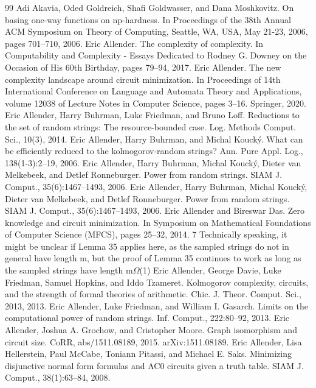 \begin{thebibliography}{99}
 Adi Akavia, Oded Goldreich, Shafi Goldwasser, and Dana Moshkovitz. On basing one-way functions on np-hardness. In Proceedings of the 38th Annual ACM Symposium on Theory of Computing, Seattle, WA, USA, May 21-23, 2006, pages 701–710, 2006.
 Eric Allender. The complexity of complexity. In Computability and Complexity - Essays Dedicated to Rodney G. Downey on the Occasion of His 60th Birthday, pages 79–94, 2017.
 Eric Allender. The new complexity landscape around circuit minimization. In Proceedings of 14th International Conference on Language and Automata Theory and Applications, volume 12038 of Lecture Notes in Computer Science, pages 3–16. Springer, 2020.
 Eric Allender, Harry Buhrman, Luke Friedman, and Bruno Loff. Reductions to the set of random strings: The resource-bounded case. Log. Methods Comput. Sci., 10(3), 2014.
 Eric Allender, Harry Buhrman, and Michal Koucký. What can be efficiently reduced to the kolmogorov-random strings? Ann. Pure Appl. Log., 138(1-3):2–19, 2006.
 Eric Allender, Harry Buhrman, Michal Koucký, Dieter van Melkebeek, and Detlef Ronneburger. Power from random strings. SIAM J. Comput., 35(6):1467–1493, 2006.
 Eric Allender, Harry Buhrman, Michal Koucký, Dieter van Melkebeek, and Detlef Ronneburger. Power from random strings. SIAM J. Comput., 35(6):1467–1493, 2006.
 Eric Allender and Bireswar Das. Zero knowledge and circuit minimization. In Symposium on Mathematical Foundations of Computer Science (MFCS), pages 25–32, 2014. 7 Technically speaking, it might be unclear if Lemma 35 applies here, as the sampled strings do not in general have length m, but the proof of Lemma 35 continues to work as long as the sampled strings have length m$\Omega$(1)
 Eric Allender, George Davie, Luke Friedman, Samuel Hopkins, and Iddo Tzameret. Kolmogorov complexity, circuits, and the strength of formal theories of arithmetic. Chic. J. Theor. Comput. Sci., 2013, 2013.
 Eric Allender, Luke Friedman, and William I. Gasarch. Limits on the computational power of random strings. Inf. Comput., 222:80–92, 2013.
 Eric Allender, Joshua A. Grochow, and Cristopher Moore. Graph isomorphism and circuit size. CoRR, abs/1511.08189, 2015. arXiv:1511.08189.
 Eric Allender, Lisa Hellerstein, Paul McCabe, Toniann Pitassi, and Michael E. Saks. Minimizing disjunctive normal form formulas and AC0 circuits given a truth table. SIAM J. Comput., 38(1):63–84, 2008.

\end{thebibliography}
